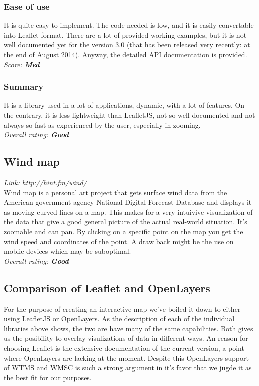 \documentclass[11pt,a4paper,titlepage,oneside]{report}
\begin{document}
   \subsubsection{Ease of use}
   It is quite easy to implement. The code needed is low, and it is easily convertable into Leaflet format. There are a lot of provided working examples, but it is not well documented yet for the version 3.0 (that has been released very recently: at the end of August 2014). Anyway, the detailed API documentation is provided.
   \\ \emph{Score: \textbf{Med}}
   \subsubsection{Summary}
   It is a library used in a lot of applications, dynamic, with a lot of features. On the contrary, it is less lightweight than LeafletJS, not so well documented and not always so fast as experienced by the user, especially in zooming.
   \\ \emph{Overall rating: \textbf{Good}}
  
  \subsection{Wind map}
  \emph{Link: \url{http://hint.fm/wind/}} \\%
    Wind map is a personal art project that gets surface wind data from the American government agency National Digital Forecast Database and displays it as moving curved lines on a map. This makes for a very intuivive visualization of the data that give a good general picture of the actual real-world situation. It's zoomable and can pan. By clicking on a specific point on the map you get the wind speed and coordinates of the point. A draw back might be the use on moblie devices which may be suboptimal.
  \\ \emph{Overall rating: \textbf{Good}}

  \subsection{Comparison of Leaflet and OpenLayers}
    For the purpose of creating an interactive map we've boiled it down to either using LeafletJS or OpenLayers. As the description of each of the individual libraries above shows, the two are have many of the same capabilities. Both gives us the posibility to overlay visulizations of data in different ways. An reason for choosing Leaflet is the extensive documentation of the current version, a point where OpenLayers are lacking at the moment. Despite this OpenLayers support of WTMS and WMSC is such a strong argument in it's favor that we jugde it as the best fit for our purposes.
    
\end{document}

